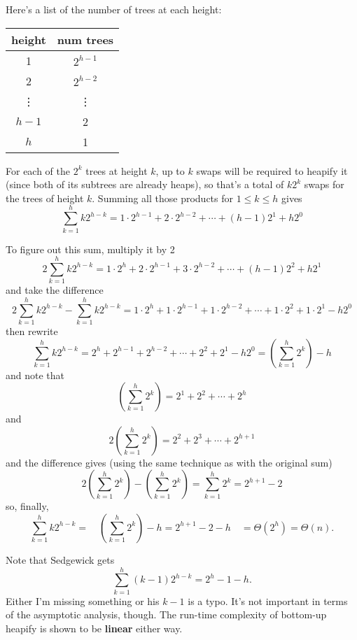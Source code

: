 \documentclass{article}
\begin{document}
\vspace{1pc}
Here's a list of the number of trees at each height:
\begin{center}
\begin{tabular}{c|c}
height  & num trees \\
\hline
 1      & $2^{h-1}$ \\
 2      & $2^{h-2}$ \\
 \vdots & \vdots    \\
 $h-1$  & 2         \\
 $h$    & 1         \\
\end{tabular}
\end{center}

For each of the $2^k$ trees at height $k$, up to $k$ swaps will be required to
heapify it (since both of its subtrees are already heaps), so that's a total of
$k2^k$ swaps for the trees of height $k$. Summing all those products for $1\le
k\le h$ gives
\[
  \sum_{k=1}^{h} k2^{h-k}
=
  1\cdot2^{h-1} + 2\cdot2^{h-2} + \cdots + (h-1)2^1 + h2^0
\]

To figure out this sum, multiply it by 2
\[
  2\sum_{k=1}^{h} k2^{h-k}
=
  1\cdot2^{h} + 2\cdot2^{h-1} + 3\cdot2^{h-2} + \cdots + (h-1)2^2 + h2^1
\]
and take the difference
\[
  2\sum_{k=1}^{h} k2^{h-k}
-
  \sum_{k=1}^{h} k2^{h-k}
=
  1\cdot2^{h} + 1\cdot2^{h-1} + 1\cdot2^{h-2} + \cdots + 1\cdot2^2 + 1\cdot2^1 - h2^0
\]
then rewrite
\[
  \sum_{k=1}^{h} k2^{h-k}
=
  2^{h} + 2^{h-1} + 2^{h-2} + \cdots + 2^2 + 2^1 - h2^0
=
  \left(\sum_{k=1}^{h} 2^{k}\right) - h
\]
and note that
\[
  \left(\sum_{k=1}^{h} 2^{k}\right)
= 
  2^1 + 2^2 + \cdots + 2^h
\]
and
\[
  2\left(\sum_{k=1}^{h} 2^{k}\right)
= 
  2^2 + 2^3 + \cdots + 2^{h+1}
\]
and the difference gives (using the same technique as with the original sum)
\[
  2\left(\sum_{k=1}^{h} 2^{k}\right)
  -\left(\sum_{k=1}^{h} 2^{k}\right)
=
  \sum_{k=1}^{h} 2^{k}
=
  2^{h+1} - 2
\]
so, finally,
\[
  \sum_{k=1}^{h} k2^{h-k}
=
\quad
  \left(\sum_{k=1}^{h} 2^{k}\right) - h
=
  2^{h+1} - 2 - h
\quad
=
  \Theta(2^h)
=
  \Theta(n).
\]

Note that Sedgewick gets
\[
  \sum_{k=1}^{h} (k-1)2^{h-k}
=
  2^{h} - 1 - h.
\]
Either I'm missing something or his $k-1$ is a typo.
It's not important in terms of the asymptotic analysis, though.
The run-time complexity of bottom-up heapify is shown to be \textbf{linear}
either way.
\end{document}

